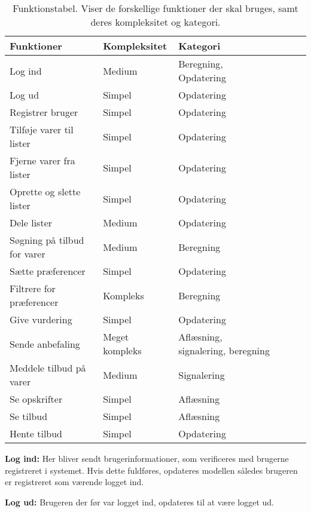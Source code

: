 \begin{table}[H]
  \centering
      \begin{tabular}{l|lllll}
      \textbf{Funktioner}			& {Kompleksitet}	& {Kategori}  	\\ \hline
      Log ind						& Medium			& Beregning, Opdatering		\\
      Log ud						& Simpel			& Opdatering	\\
      Registrer bruger				& Simpel			& Opdatering	\\
      Tilføje varer til lister		& Simpel       		& Opdatering	\\ 
      Fjerne varer fra lister		& Simpel       		& Opdatering	\\ 
      Oprette og slette lister		& Simpel       		& Opdatering	\\ 
      Dele lister					& Medium       		& Opdatering	\\ 
      Søgning på tilbud for varer   & Medium     		& Beregning		\\ 
      Sætte præferencer				& Simpel       		& Opdatering	\\ 
      Filtrere for præferencer		& Kompleks     		& Beregning		\\ 
      Give vurdering				& Simpel       		& Opdatering	\\ 
      Sende anbefaling				& Meget kompleks	& Aflæsning, signalering, beregning		\\ 
      Meddele tilbud på varer		& Medium      		& Signalering	\\ 
	  Se opskrifter					& Simpel       		& Aflæsning		\\ 
	  Se tilbud						& Simpel       		& Aflæsning		\\ 
      Hente tilbud					& Simpel	       	& Opdatering	\\           
    \end{tabular}
  \caption{Funktionstabel. Viser de forskellige funktioner der skal bruges, samt deres kompleksitet og kategori.}\label{tabel:functionstable}
\end{table}

\textbf{Log ind:} Her bliver sendt brugerinformationer, som verificeres med brugerne registreret i systemet. 
Hvis dette fuldføres, opdateres modellen således brugeren er registreret som værende logget ind.

\textbf{Log ud:} Brugeren der før var logget ind, opdateres til at være logget ud.


